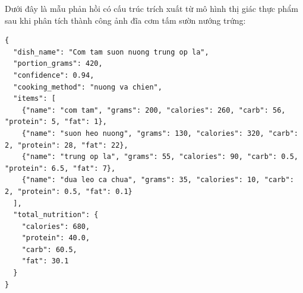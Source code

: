 Dưới đây là mẫu phản hồi có cấu trúc trích xuất từ mô hình thị giác thực phẩm sau khi phân tích thành công ảnh đĩa cơm tấm sườn nướng trứng:

\begin{lstlisting}[language={}, caption={Mẫu đối tượng JSON trích xuất từ mô hình thị giác thực phẩm}, label={lst:json_sample}]
{
  "dish_name": "Com tam suon nuong trung op la",
  "portion_grams": 420,
  "confidence": 0.94,
  "cooking_method": "nuong va chien",
  "items": [
    {"name": "com tam", "grams": 200, "calories": 260, "carb": 56, "protein": 5, "fat": 1},
    {"name": "suon heo nuong", "grams": 130, "calories": 320, "carb": 2, "protein": 28, "fat": 22},
    {"name": "trung op la", "grams": 55, "calories": 90, "carb": 0.5, "protein": 6.5, "fat": 7},
    {"name": "dua leo ca chua", "grams": 35, "calories": 10, "carb": 2, "protein": 0.5, "fat": 0.1}
  ],
  "total_nutrition": {
    "calories": 680,
    "protein": 40.0,
    "carb": 60.5,
    "fat": 30.1
  }
}
\end{lstlisting}
